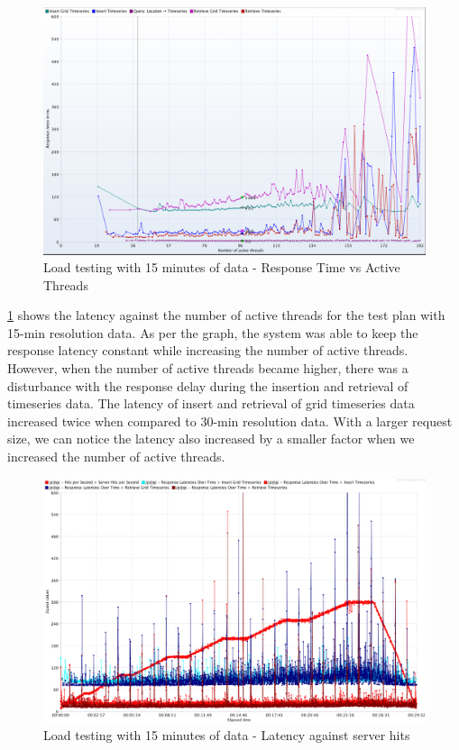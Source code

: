 \begin{figure}[htp]
    \centering
    \includegraphics[width=1.0\textwidth]{results/obs/all/obs_all_15m_response_times_vs_threads.png}
    \caption{Load testing with 15 minutes of data - Response Time vs Active Threads}
    \label{fi:test_obs_all_15m_response_vs_threads}
\end{figure}

\cref{fi:test_obs_all_15m_response_vs_threads} shows the latency against the number of active threads for the test plan with 15-min resolution data. As per the graph, the system was able to keep the response latency constant while increasing the number of active threads. However, when the number of active threads became higher, there was a disturbance with the response delay during the insertion and retrieval of timeseries data. The latency of insert and retrieval of grid timeseries data increased twice when compared to 30-min resolution data. With a larger request size, we can notice the latency also increased by a smaller factor when we increased the number of active threads. 

\begin{figure}[htp]
    \centering
    \includegraphics[width=1.0\textwidth]{results/obs/all/obs_all_15m_res_latencies_against_hits.png}
    \caption{Load testing with 15 minutes of data - Latency against server hits}
    \label{fi:test_obs_all_15m_latency}
\end{figure}

